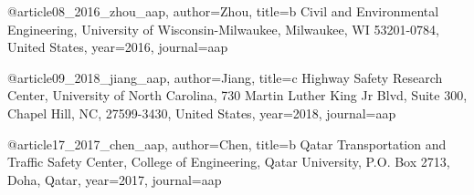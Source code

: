 @article{08_2016_zhou_aap,
  author={Zhou},
  title={b Civil and Environmental Engineering, University of Wisconsin-Milwaukee, Milwaukee, WI 53201-0784, United States},
  year={2016},
  journal={aap}
}

@article{09_2018_jiang_aap,
  author={Jiang},
  title={c Highway Safety Research Center, University of North Carolina, 730 Martin Luther King Jr Blvd, Suite 300, Chapel Hill, NC, 27599-3430, United States},
  year={2018},
  journal={aap}
}

@article{17_2017_chen_aap,
  author={Chen},
  title={b Qatar Transportation and Traﬃc Safety Center, College of Engineering, Qatar University, P.O. Box 2713, Doha, Qatar},
  year={2017},
  journal={aap}
}
